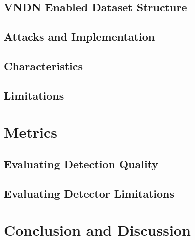 \documentclass[journal,comsoc]{IEEEtran}
\begin{document}
\subsection{ VNDN Enabled Dataset Structure}



\subsection{Attacks and Implementation} 
\subsection{Characteristics}
\subsection{Limitations}

\section{Metrics}
\subsection{Evaluating Detection Quality}
\subsection{Evaluating Detector Limitations}
\section{Conclusion and Discussion}

\end{document}
